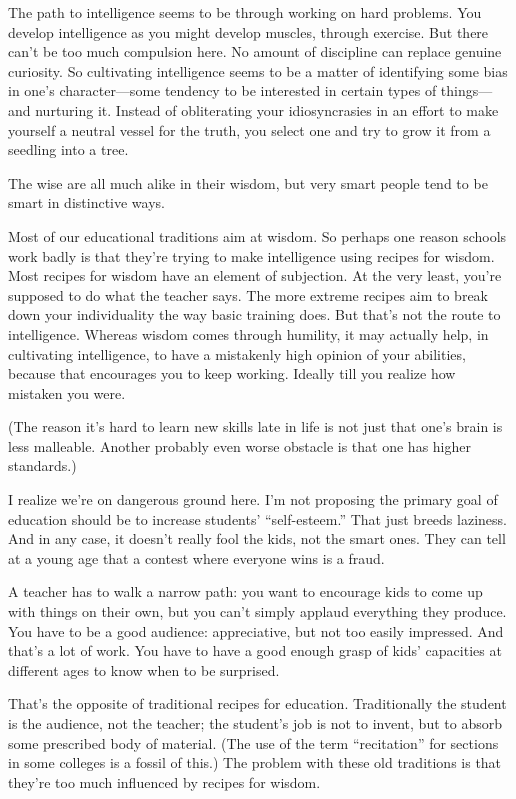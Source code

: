 The path to intelligence seems to be through working on hard problems.
You develop intelligence as you might develop muscles, through exercise.
But there can't be too much compulsion here. No amount of discipline can
replace genuine curiosity. So cultivating intelligence seems to be a
matter of identifying some bias in one's character---some tendency to be
interested in certain types of things---and nurturing it. Instead of
obliterating your idiosyncrasies in an effort to make yourself a neutral
vessel for the truth, you select one and try to grow it from a seedling
into a tree.

The wise are all much alike in their wisdom, but very smart people tend
to be smart in distinctive ways.

Most of our educational traditions aim at wisdom. So perhaps one reason
schools work badly is that they're trying to make intelligence using
recipes for wisdom. Most recipes for wisdom have an element of
subjection. At the very least, you're supposed to do what the teacher
says. The more extreme recipes aim to break down your individuality the
way basic training does. But that's not the route to intelligence.
Whereas wisdom comes through humility, it may actually help, in
cultivating intelligence, to have a mistakenly high opinion of your
abilities, because that encourages you to keep working. Ideally till you
realize how mistaken you were.

(The reason it's hard to learn new skills late in life is not just that
one's brain is less malleable. Another probably even worse obstacle is
that one has higher standards.)

I realize we're on dangerous ground here. I'm not proposing the primary
goal of education should be to increase students' ``self-esteem.'' That
just breeds laziness. And in any case, it doesn't really fool the kids,
not the smart ones. They can tell at a young age that a contest where
everyone wins is a fraud.

A teacher has to walk a narrow path: you want to encourage kids to come
up with things on their own, but you can't simply applaud everything
they produce. You have to be a good audience: appreciative, but not too
easily impressed. And that's a lot of work. You have to have a good
enough grasp of kids' capacities at different ages to know when to be
surprised.

That's the opposite of traditional recipes for education. Traditionally
the student is the audience, not the teacher; the student's job is not
to invent, but to absorb some prescribed body of material. (The use of
the term ``recitation'' for sections in some colleges is a fossil of
this.) The problem with these old traditions is that they're too much
influenced by recipes for wisdom.

